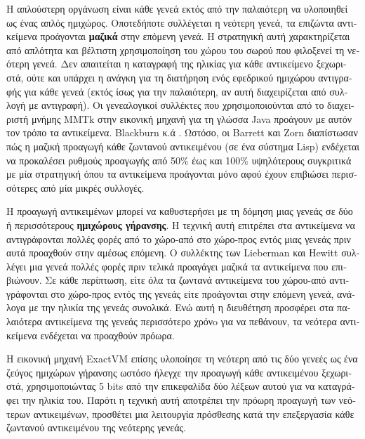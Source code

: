\begin{greek}
Η απλούστερη οργάνωση είναι κάθε γενεά εκτός από την παλαιότερη να υλοποιηθεί ως
ένας απλός ημιχώρος. Οποτεδήποτε συλλέγεται η νεότερη γενεά, τα επιζώντα αντικείμενα
προάγονται \textbf{μαζικά} στην επόμενη γενεά. Η στρατηγική αυτή χαρακτηρίζεται
από απλότητα και βέλτιστη χρησιμοποίηση του χώρου του σωρού που φιλοξενεί τη νεότερη
γενεά. Δεν απαιτείται η καταγραφή της ηλικίας για κάθε αντικείμενο ξεχωριστά, ούτε και
υπάρχει η ανάγκη για τη διατήρηση ενός εφεδρικού ημιχώρου αντιγραφής για κάθε γενεά
(εκτός ίσως για την παλαιότερη, αν αυτή διαχειρίζεται από συλλογή με αντιγραφή). Οι
γενεαλογικοί συλλέκτες που χρησιμοποιούνται από το διαχειριστή μνήμης MMTk στην
εικονική μηχανή για τη γλώσσα Java προάγουν με αυτόν τον τρόπο τα αντικείμενα.
Blackburn κ.ά \cite{DBLP:conf/iwmm/BlackburnH04}. Ωστόσο, οι Barrett και Zorn \cite{DBLP:conf/pldi/BarrettZ93}
διαπίστωσαν πώς η μαζική προαγωγή κάθε ζωντανού αντικειμένου (σε ένα σύστημα Lisp)
ενδέχεται να προκαλέσει ρυθμούς προαγωγής από 50\% έως και 100\% υψηλότερους
συγκριτικά με μία στρατηγική όπου τα αντικείμενα προάγονται μόνο αφού έχουν
επιβιώσει περισσότερες από μία μικρές συλλογές.

Η προαγωγή αντικειμένων μπορεί να καθυστερήσει με τη δόμηση
μιας γενεάς σε δύο ή περισσότερους \textbf{ημιχώρους γήρανσης}.
Η τεχνική αυτή επιτρέπει στα αντικείμενα να αντιγράφονται
πολλές φορές από το χώρο-από στο χώρο-προς εντός μιας γενεάς
πριν αυτά προαχθούν στην αμέσως επόμενη. Ο συλλέκτης των Lieberman
και Hewitt \cite{DBLP:journals/cacm/LiebermanH83} συλλέγει μια
γενεά πολλές φορές πριν τελικά προαγάγει μαζικά τα αντικείμενα
που επιβιώνουν. Σε κάθε περίπτωση, είτε όλα τα ζωντανά αντικείμενα
του χώρου-από αντιγράφονται στο χώρο-προς εντός της γενεάς είτε
προάγονται στην επόμενη γενεά, ανάλογα με την ηλικία της γενεάς
συνολικά. Ενώ αυτή η διευθέτηση προσφέρει στα παλαιότερα αντικείμενα
της γενεάς περισσότερο χρόνo για να πεθάνουν, τα νεότερα αντικείμενα
ενδέχεται να προαχθούν πρόωρα.

Η εικονική μηχανή ExactVM επίσης υλοποίησε τη νεότερη από τις
δύο γενεές ως ένα ζεύγος ημιχώρων γήρανσης ωστόσο ήλεγχε την
προαγωγή κάθε αντικειμένου ξεχωριστά, χρησιμοποιώντας 5 bits
από την επικεφαλίδα δύο λέξεων αυτού για να καταγράφει την
ηλικία του. Παρότι η τεχνική αυτή αποτρέπει την πρόωρη προαγωγή
των νεότερων αντικειμένων, προσθέτει μια λειτουργία πρόσθεσης
κατά την επεξεργασία κάθε ζωντανού αντικειμένου της νεότερης
γενεάς.


\end{greek}
